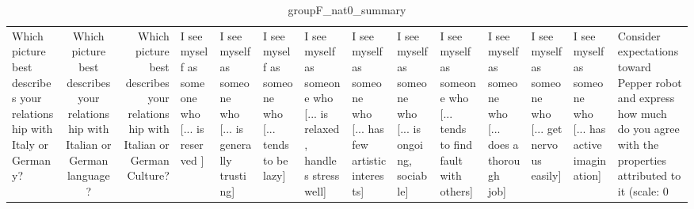 \begin{table}
\caption{groupF_nat0_summary}
\label{tab:groupF_nat0_summary}
\begin{tabular}{lcr}
\toprule
Which picture best describes your relationship with Italy or Germany? & Which picture best describes your relationship with Italian or German language? & Which picture best describes your relationship with Italian or German Culture? & I see myself as someone who  [... is reserved ] & I see myself as someone who  [... is generally trusting] & I see myself as someone who  [... tends to be lazy] & I see myself as someone who  [... is relaxed, handles stress well] & I see myself as someone who  [... has few artistic interests] & I see myself as someone who  [... is ongoing, sociable] & I see myself as someone who  [... tends to find fault with others] & I see myself as someone who  [... does a thorough job] & I see myself as someone who  [... get nervous easily] & I see myself as someone who  [... has active imagination] & Consider expectations toward Pepper robot and express how much do you agree with the properties attributed to it (scale: 0%
\end{tabular}
\end{table}
